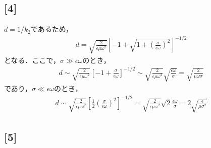 \documentclass[12pt,dvipdfmx]{jsarticle}
\begin{document}
\subsection*{\large{[4]}}
$d=1/k_2$であるため，
\begin{eqnarray}
  d = \sqrt{\frac{2}{\epsilon\mu\omega^2}}\left[ -1+\sqrt{1+\left(\frac{\sigma}{\epsilon\omega}\right)^2} \right]^{-1/2}
\end{eqnarray}
となる．ここで，$\sigma\gg \epsilon\omega$のとき，
\begin{eqnarray}
  d \sim \sqrt{\frac{2}{\epsilon\mu\omega^2}} \left[ -1+\frac{\sigma}{\epsilon\omega} \right]^{-1/2}\sim \sqrt{\frac{2}{\epsilon\mu\omega^2}}\sqrt{\frac{\epsilon\omega}{\sigma}} = \sqrt{\frac{2}{\mu\omega\sigma}}
\end{eqnarray}
であり，$\sigma\ll \epsilon\omega$のとき，
\begin{eqnarray}
  d \sim \sqrt{\frac{2}{\epsilon\mu\omega^2}} \left[\frac{1}{2}\left(\frac{\sigma}{\epsilon\omega}\right)^2 \right]^{-1/2} = \sqrt{\frac{2}{\epsilon\mu\omega^2}}\sqrt{2}\frac{\epsilon\omega}{\sigma}=2\sqrt{\frac{\epsilon}{\mu\sigma^2}}
\end{eqnarray}
\subsection*{\large{[5]}}
\end{document}

